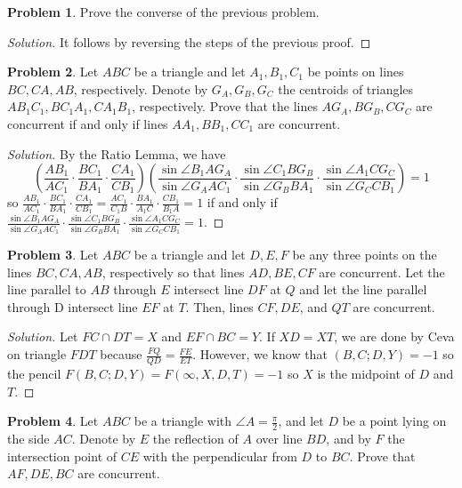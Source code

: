 \documentclass[a4paper]{article}
\theoremstyle{definition}
\newtheorem{problem}{Problem}[subsection]
\begin{document}
\begin{problem}
Prove the converse of the previous problem.
\end{problem}

\begin{proof}[Solution]
It follows by reversing the steps of the previous proof.
\end{proof}

\begin{problem}
Let $ABC$ be a triangle and let $A_1, B_1, C_1$ be points on lines $BC, CA, AB$, respectively. Denote by $G_A, G_B, G_C$ the centroids of triangles $AB_1C_1, BC_1A_1, CA_1B_1$, respectively. Prove that the lines $AG_A, BG_B, CG_C$ are concurrent if and only if lines $AA_1, BB_1, CC_1$ are concurrent.
\end{problem}

\begin{proof}[Solution]
By the Ratio Lemma, we have
\[ \left(\frac{AB_1}{AC_1} \cdot \frac{BC_1}{BA_1} \cdot \frac{CA_1}{CB_1}\right) \left(\frac{\sin \angle B_1AG_A}{\sin \angle G_AAC_1} \cdot \frac{\sin \angle C_1BG_B}{\sin \angle G_BBA_1} \cdot \frac{\sin \angle A_1CG_C}{\sin \angle G_CCB_1}\right) = 1 \]
so $\frac{AB_1}{AC_1} \cdot \frac{BC_1}{BA_1} \cdot \frac{CA_1}{CB_1} = \frac{AC_1}{C_1B} \cdot \frac{BA_1}{A_1C} \cdot \frac{CB_1}{B_1A} = 1$ if and only if $\frac{\sin \angle B_1AG_A}{\sin \angle G_AAC_1} \cdot \frac{\sin \angle C_1BG_B}{\sin \angle G_BBA_1} \cdot \frac{\sin \angle A_1CG_C}{\sin \angle G_CCB_1} = 1$.
\end{proof}

\begin{problem}
Let $ABC$ be a triangle and let $D, E, F$ be any three points on the  lines $BC, CA, AB$, respectively so that lines $AD, BE, CF$ are concurrent. Let the line parallel to $AB$ through $E$ intersect line $DF$ at $Q$ and let the line parallel through D intersect line $EF$ at $T$. Then, lines $CF, DE$, and $QT$ are concurrent.
\end{problem}

\begin{proof}[Solution]
Let $FC \cap DT = X$ and $EF \cap BC = Y$. If $XD = XT$, we are done by Ceva on triangle $FDT$ because $\frac{FQ}{QD} = \frac{FE}{ET}$. However, we know that $(B, C; D, Y) = -1$ so the pencil $F(B, C; D, Y) = F(\infty, X, D, T) = -1$ so $X$ is the midpoint of $D$ and $T$.
\end{proof}

\begin{problem}
Let $ABC$ be a triangle with $\angle A = \frac{\pi}{2}$, and let $D$ be a point lying on the side $AC$. Denote by $E$ the reflection of $A$ over line $BD$, and by $F$ the intersection point of $CE$ with the perpendicular from $D$ to $BC$. Prove that $AF, DE, BC$ are concurrent.
\end{problem}
\end{document}

